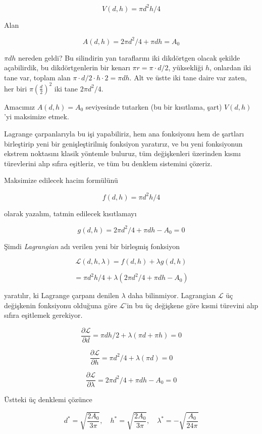 \documentclass[12pt,fleqn]{article}\usepackage{../../common}
\begin{document}
$$
V(d,h) = \pi d^2 h / 4
$$

Alan

$$
A(d,h) = 2 \pi d^2 / 4 + \pi d h = A_0
$$

$\pi d h$ nereden geldi? Bu silindirin yan taraflarını iki dikdörtgen
olacak şekilde açabilirdik, bu dikdörtgenlerin bir kenarı
$\pi r = \pi \cdot d/2$, yüksekliği $h$, onlardan iki tane var, toplam alan
$\pi \cdot d/2 \cdot h \cdot 2 = \pi d h$. Alt ve üstte iki tane daire var
zaten, her biri $\pi \left( \frac{d}{2} \right)^2$ iki tane
$2 \pi d^2 / 4 $. 

Amacımız $A(d,h) = A_0$ seviyesinde tutarken (bu bir kısıtlama, şart)
$V(d,h)$'yi maksimize etmek. 

Lagrange çarpanlarıyla bu işi yapabiliriz, hem ana fonksiyonu hem de
şartları birleştirip yeni bir genişleştirilmiş fonksiyon yaratırız, ve bu
yeni fonksiyonun ekstrem noktasını klasik yöntemle buluruz, tüm
değişkenleri üzerinden kısmı türevlerini alıp sıfıra eşitleriz, ve tüm bu
denklem sistemini çözeriz. 

Maksimize edilecek hacim formülünü 

$$
f(d,h) = \pi d^2 h / 4
$$

olarak yazalım, tatmin edilecek kısıtlamayı

$$
g(d,h) = 2 \pi d^2 / 4 + \pi d h - A_0 = 0
$$

Şimdi {\em Lagrangian} adı verilen yeni bir birleşmiş fonksiyon 

$$
\mathcal{L}(d,h,\lambda) = f(d,h) + \lambda g(d,h) 
$$

$$
= \pi d^2 h / 4 + \lambda (2 \pi d^2 / 4 + \pi d h - A_0 )
$$

yaratılır, ki Lagrange çarpanı denilen $\lambda$ daha
bilinmiyor. Lagrangian $\mathcal{L}$ üç değişkenin fonksiyonu olduğuna göre
$\mathcal{L}$'in bu üç değişkene göre kısmi türevini alıp sıfıra eşitlemek
gerekiyor. 

$$
\frac{\partial \mathcal{L}}{\partial d} = \pi d h / 2 + \lambda (\pi d + \pi h) = 0
$$

$$
\frac{\partial \mathcal{L}}{\partial h} = \pi d^2 / 4 + \lambda (\pi d) = 0 
$$

$$
\frac{\partial \mathcal{L}}{\partial \lambda} = 2\pi d^2 / 4 + \pi d h - A_0 = 0
$$

Üstteki üç denklemi çözünce 

$$
d^\ast = \sqrt{\frac{2 A_0}{3 \pi}}, \quad
h^\ast = \sqrt{\frac{2 A_0}{3 \pi}}, \quad
\lambda^\ast = -\sqrt{\frac{A_0}{24 \pi}}
$$
\end{document}
